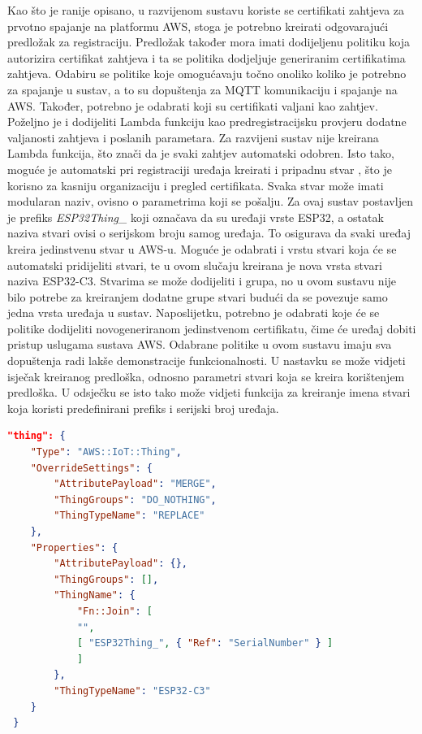 Kao što je ranije opisano, u razvijenom sustavu koriste se certifikati zahtjeva za prvotno spajanje na platformu AWS, stoga je potrebno kreirati odgovarajući predložak za registraciju. Predložak također mora imati dodijeljenu politiku koja autorizira certifikat zahtjeva i ta se politika dodjeljuje generiranim certifikatima zahtjeva. Odabiru se politike koje omogućavaju točno onoliko koliko je potrebno za spajanje u sustav, a to su dopuštenja za MQTT komunikaciju i spajanje na AWS. Također, potrebno je odabrati koji su certifikati valjani kao zahtjev. Poželjno je i dodijeliti Lambda funkciju kao predregistracijsku provjeru dodatne valjanosti zahtjeva i poslanih parametara. Za razvijeni sustav nije kreirana Lambda funkcija, što znači da je svaki zahtjev automatski odobren. Isto tako, moguće je automatski pri registraciji uređaja kreirati i pripadnu stvar , što je korisno za kasniju organizaciju i pregled certifikata. Svaka stvar može imati modularan naziv, ovisno o parametrima koji se pošalju. Za ovaj sustav postavljen je prefiks \textit{ESP32Thing\_} koji označava da su uređaji vrste ESP32, a ostatak naziva stvari ovisi o serijskom broju samog uređaja. To osigurava da svaki uređaj kreira jedinstvenu stvar u AWS-u. Moguće je odabrati i vrstu stvari  koja će se automatski pridijeliti stvari, te u ovom slučaju kreirana je nova vrsta stvari naziva ESP32-C3. Stvarima se može dodijeliti i grupa, no u ovom sustavu nije bilo potrebe za kreiranjem dodatne grupe stvari budući da se povezuje samo jedna vrsta uređaja u sustav. Naposlijetku, potrebno je odabrati koje će se politike dodijeliti novogeneriranom jedinstvenom certifikatu, čime će uređaj dobiti pristup uslugama sustava AWS. Odabrane politike u ovom sustavu imaju sva dopuštenja radi lakše demonstracije funkcionalnosti. U nastavku se može vidjeti isječak kreiranog predloška, odnosno parametri stvari koja se kreira korištenjem predloška. U odsječku se isto tako može vidjeti funkcija za kreiranje imena stvari koja koristi predefinirani prefiks i serijski broj uređaja. 

\begin{lstlisting}[caption={Odjeljak \textit{stvar} u predlošku za registraciju}, language=json]
 "thing": {
	"Type": "AWS::IoT::Thing",
	"OverrideSettings": {
		"AttributePayload": "MERGE",
		"ThingGroups": "DO_NOTHING",
		"ThingTypeName": "REPLACE"
	},
	"Properties": {
		"AttributePayload": {},
		"ThingGroups": [],
		"ThingName": {
			"Fn::Join": [
			"",
			[ "ESP32Thing_", { "Ref": "SerialNumber" } ]
			]
		},
		"ThingTypeName": "ESP32-C3"
	}
 }
\end{lstlisting}


